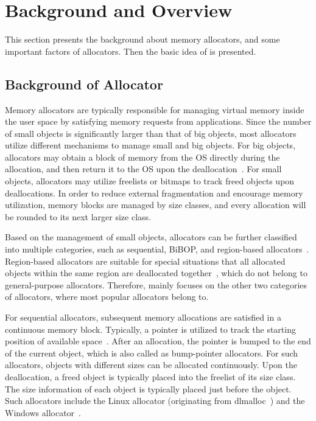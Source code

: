 \section{Background and Overview}
\label{sec:background}

This section presents the background about memory allocators, and some important factors of allocators. Then the basic idea of \MP{} is presented. 

\subsection{Background of Allocator}

\label{sec:allocator}
Memory allocators are typically responsible for managing virtual memory inside the user space by satisfying memory requests from applications. Since the number of small objects is significantly larger than that of big objects, most allocators utilize different mechanisms to manage small and big objects. For big objects, allocators may obtain a block of memory from the OS directly during the allocation, and then return it to the OS upon the deallocation~\citep{Hoard}. For small objects, allocators may utilize freelists or bitmaps to track freed objects upon deallocations. In order to reduce external fragmentation and encourage memory utilization, memory blocks are managed by size classes, and every allocation will be rounded to its next larger size class.  

Based on the management of small objects, allocators can be further classified into multiple categories, such as sequential, BiBOP, and region-based allocators~\citep{DieHarder, Gay:1998:MME:277650.277748}. Region-based allocators are suitable for special situations that all allocated objects within the same region are deallocated together~\citep{Gay:1998:MME:277650.277748}, which do not belong to general-purpose allocators. Therefore, \MP{} mainly focuses on the other two categories of allocators, where most popular allocators belong to. 

For sequential allocators, subsequent memory allocations are satisfied in a continuous memory block. Typically, a pointer is utilized to track the starting position of available space~\citep{Cling}. After an allocation, the pointer is bumped to the end of the current object, which is also called as bump-pointer allocators. For such allocators, objects with different sizes can be allocated continuously. Upon the deallocation, a freed object is typically placed into the freelist of its size class. The size information of each object is typically placed just before the object. Such allocators include the Linux allocator (originating from dlmalloc~\citep{dlmalloc}) and the Windows allocator~\citep{DieHarder}.  

